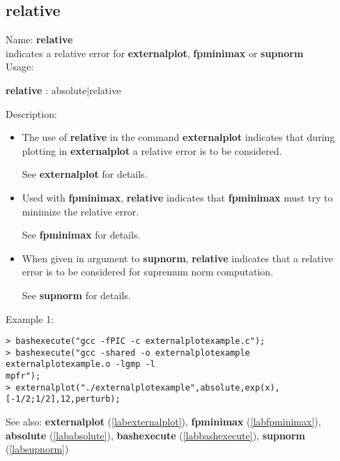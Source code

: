 \subsection{relative}
\label{labrelative}
\noindent Name: \textbf{relative}\\
indicates a relative error for \textbf{externalplot}, \textbf{fpminimax} or \textbf{supnorm}\\
\noindent Usage: 
\begin{center}
\textbf{relative} : \textsf{absolute$|$relative}\\
\end{center}
\noindent Description: \begin{itemize}

\item The use of \textbf{relative} in the command \textbf{externalplot} indicates that during
   plotting in \textbf{externalplot} a relative error is to be considered.
    
   See \textbf{externalplot} for details.

\item Used with \textbf{fpminimax}, \textbf{relative} indicates that \textbf{fpminimax} must try to minimize
   the relative error.
    
   See \textbf{fpminimax} for details.

\item When given in argument to \textbf{supnorm}, \textbf{relative} indicates that a relative error
   is to be considered for supremum norm computation.
    
   See \textbf{supnorm} for details.
\end{itemize}
\noindent Example 1: 
\begin{center}\begin{minipage}{15cm}\begin{Verbatim}[frame=single]
> bashexecute("gcc -fPIC -c externalplotexample.c");
> bashexecute("gcc -shared -o externalplotexample externalplotexample.o -lgmp -l
mpfr");
> externalplot("./externalplotexample",absolute,exp(x),[-1/2;1/2],12,perturb);
\end{Verbatim}
\end{minipage}\end{center}
See also: \textbf{externalplot} (\ref{labexternalplot}), \textbf{fpminimax} (\ref{labfpminimax}), \textbf{absolute} (\ref{lababsolute}), \textbf{bashexecute} (\ref{labbashexecute}), \textbf{supnorm} (\ref{labsupnorm})
